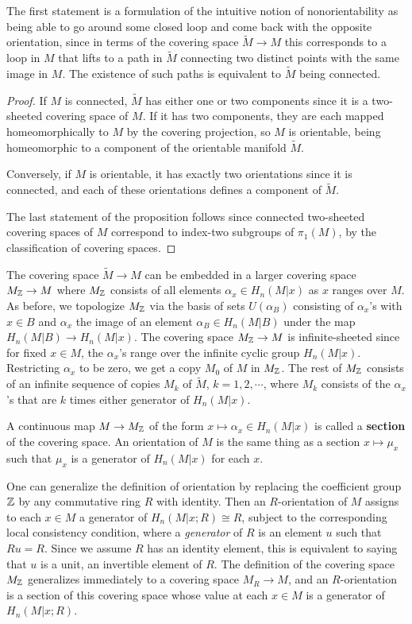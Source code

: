The first statement is a formulation of the intuitive notion of nonorientability as being able to go around some closed loop and come back with the opposite orientation, since in terms of the covering space $\widetilde{M}\to M$ this corresponds to a loop in $M$ that lifts to a path in $\widetilde{M}$ connecting two distinct points with the same image in $M$. The existence of such paths is equivalent to $\widetilde{M}$ being connected.
\begin{proof}
If $M$ is connected, $\widetilde{M}$ has either one or two components since it is a two-sheeted covering space of $M$. If it has two components, they are each mapped homeomorphically to $M$ by the covering projection, so $M$ is orientable, being homeomorphic to a component of the orientable manifold $\widetilde{M}$.\par
Conversely, if $M$ is orientable, it has exactly two orientations since it is connected, and each of these orientations defines a component of $\widetilde{M}$.\par 
The last statement of the proposition follows since connected two-sheeted covering spaces of $M$ correspond to index-two subgroups of $\pi_1(M)$, by
the classification of covering spaces.
\end{proof}
The covering space $\widetilde{M}\to M$ can be embedded in a larger covering space $M_{\mathbb{Z}}\to M$ where $M_{\mathbb{Z}}$ consists of all elements $\alpha_x\in H_n(M|x)$ as $x$ ranges over $M$. As before, we topologize $M_{\mathbb{Z}}$ via the basis of sets $U(\alpha_B)$ consisting of $\alpha_x$'s with $x\in B$ and $\alpha_x$ the image of an element $\alpha_B\in H_n(M|B)$ under the map $H_n(M|B)\to H_n(M|x)$. The covering space $M_{\mathbb{Z}}\to M$ is infinite-sheeted since for fixed $x\in M$, the $\alpha_x$'s range over the infinite cyclic group $H_n(M|x)$. Restricting $\alpha_x$ to be zero, we get a copy $M_0$ of $M$ in $M_{\mathbb{Z}}$. The rest of $M_{\mathbb{Z}}$ consists of an infinite sequence of copies $M_k$ of $\widetilde{M}$, $k=1,2,\cdots$, where $M_k$ consists of the $\alpha_x$'s that are $k$ times either generator of $H_n(M|x)$.\par
A continuous map $M\to M_{\mathbb{Z}}$ of the form $x\mapsto \alpha_x\in H_n(M|x)$ is called a \textbf{section} of the covering space. An orientation of $M$ is the same thing as a section $x\mapsto\mu_x$ such that $\mu_x$ is a generator of $H_n(M|x)$ for each $x$.\par
One can generalize the definition of orientation by replacing the coefficient group $\mathbb{Z}$ by any commutative ring $R$ with identity. Then an $R$-orientation of $M$ assigns to each $x\in M$ a generator of $H_n(M|x;R)\cong R$, subject to the corresponding local consistency condition, where a \textit{generator} of $R$ is an element $u$ such that $Ru=R$. Since we assume $R$ has an identity element, this is equivalent to saying that $u$ is a unit, an invertible element of $R$. The definition of the covering space $M_{\mathbb{Z}}$ generalizes immediately to a covering space $M_R\to M$, and an $R$-orientation is a section of this covering space whose value at each $x\in M$ is a generator of $H_n(M|x;R)$.\par

